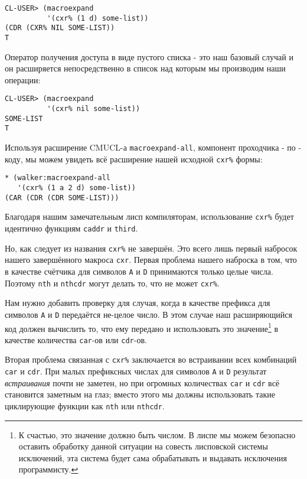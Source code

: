 \begin{verbatim}
CL-USER> (macroexpand
          '(cxr% (1 d) some-list))
(CDR (CXR% NIL SOME-LIST))
T
\end{verbatim}

Оператор получения доступа в виде пустого списка - это наш базовый случай и он расширяется непосредственно в список над которым мы производим наши операции:

\begin{verbatim}
CL-USER> (macroexpand
          '(cxr% nil some-list))
SOME-LIST
T
\end{verbatim}

Используя расширение CMUCL-а \verb"macroexpand-all", компонент проходчика - по - коду, мы можем увидеть всё расширение нашей исходной \verb"cxr%" формы:

\begin{verbatim}
* (walker:macroexpand-all
   '(cxr% (1 a 2 d) some-list))
(CAR (CDR (CDR SOME-LIST)))
\end{verbatim}

Благодаря нашим замечательным лисп компиляторам, использование \verb"cxr%" будет идентично функциям \verb"caddr" и \verb"third".

Но, как следует из названия \verb"cxr%" не завершён. Это всего лишь первый набросок нашего завершённого макроса \verb"cxr". Первая проблема нашего наброска в том, что в качестве счётчика для символов \verb"A" и \verb"D" принимаются только целые числа. Поэтому \verb"nth" и \verb"nthcdr" могут делать то, что не может \verb"cxr%".

Нам нужно добавить проверку для случая, когда в качестве префикса для символов \verb"A" и \verb"D" передаётся не-целое число. В этом случае наш расширяющийся код должен вычислить то, что ему передано и использовать это значение\footnote{К счастью, это значение должно быть числом. В лиспе мы можем безопасно оставить обработку данной ситуации на совесть лисповской системы исключений, эта система будет сама обрабатывать и выдавать исключения программисту.} в качестве количества \verb"car"-ов или \verb"cdr"-ов.



Вторая проблема связанная с \verb"cxr%" заключается во встраивании всех комбинаций \verb"car" и \verb"cdr". При малых префиксных числах для символов \verb"A" и \verb"D" результат \emph{встраивания} почти не заметен, но при огромных количествах \verb"car" и \verb"cdr" всё становится заметным на глаз; вместо этого мы должны использовать такие циклирующие функции как \verb"nth" или \verb"nthcdr".

